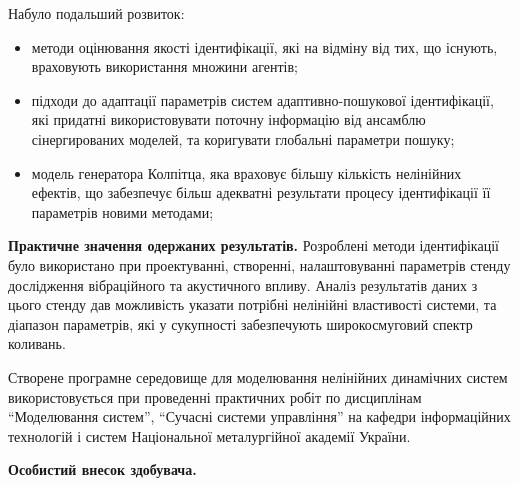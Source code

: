 \documentclass[a4paper,13pt]{atuaref}
\begin{document}
\noindent
Набуло подальший розвиток:
\begin{itemize}

  \item
  методи оцінювання якості ідентифікації,
  які на відміну від тих, що існують,
  враховують використання множини агентів;

  \item
  підходи до адаптації параметрів систем
  адаптивно-пошукової ідентифікації, які придатні використовувати поточну
  інформацію від ансамблю сінергированих моделей, та коригувати глобальні
  параметри пошуку;

  \item
    модель генератора Колпітца, яка враховує
    більшу кількість нелінійних ефектів,
    що забезпечує більш адекватні результати процесу
    ідентифікації її параметрів новими методами;

\end{itemize}


\smallskip
\textbf{Практичне значення одержаних результатів.}
Розроблені методи ідентифікації було використано
при проектуванні, створенні, налаштовуванні параметрів
стенду дослідження вібраційного та акустичного впливу.
Аналіз результатів даних з цього стенду
дав можливість указати потрібні нелінійні властивості системи,
та діапазон параметрів, які у сукупності
забезпечують широкосмуговий спектр коливань.

Створене програмне середовище для моделювання нелінійних динамічних систем
використовується при проведенні практичних робіт по дисциплінам
``Моделювання систем'',
``Сучасні системи управління'' на кафедри інформаційних технологій
і систем Національної металургійної академії України.


\smallskip
\textbf{Особистий внесок здобувача.}
\end{document}
